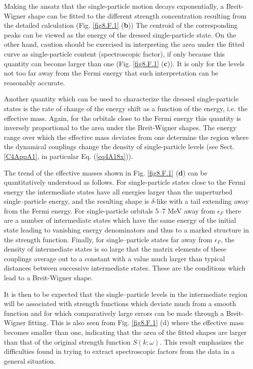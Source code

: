 Making the ansatz that the single-particle motion decays exponentially, a Breit-Wigner shape can be fitted to the different strength concentration resulting from the detailed calculation (Fig. \ref{fig8.F.1} (\textbf{b})) The centroid of the corresponding peaks can be viewed as the energy of the dressed single-particle state. On the other hand, caution should be exercised in interpreting the area under the fitted curve as single-particle content (spectroscopic factor), if only because this quantity can become larger than one (Fig. \ref{fig8.F.1} (\textbf{c})). It is only for the levels not too far away from the Fermi energy that such interpretation can   be reasonably accurate.


Another quantity which can be used to characterize the dressed single-particle states is the rate of change of the energy shift as a function of the energy, i.e. the effective mass. Again, for the orbitals close to the Fermi energy this quantity is inversely proportional to the area under the Breit-Wigner shapes. The energy range over which the effective mass deviates from one determine the region where the dynamical couplings change the density of single-particle levels (see Sect. \ref{C4AppA1}, in particular Eq. (\ref{eq4A18x})).



The trend of the effective masses shown in Fig. \ref{fig8.F.1} (\textbf{d}) can be quantitatively understood as follows. For single-particle states close to the Fermi energy the intermediate states have all energies larger than the unperturbed single--particle energy, and the resulting shape is $\delta$-like with a tail extending away from the Fermi energy. For single-particle orbitals 5--7 MeV away from $\epsilon_F$ there are a number of intermediate states which have the same energy of the initial state leading to vanishing energy denominators and thus to a marked structure in the strength function. Finally, for single--particle states far away from $\epsilon_F$, the density of intermediate states is so large that the matrix elements of these couplings average out to a constant with a value much larger than typical distances between successive intermediate states. These are the conditions which lead to a Breit-Wigner shape.  


It is then to be expected that the single--particle levels in the intermediate region will be associated with strength functions which deviate much from a smooth function and for which comparatively large errors can be made through a Breit-Wigner fitting. This is also seen from Fig. \ref{fig8.F.1} (d) where the effective mass becomes smaller than one, indicating that the area of the fitted shapes are larger than that of the original strength function $S(k;\omega)$. This result emphasizes the difficulties found in trying to extract spectroscopic factors from the data in a general situation.


